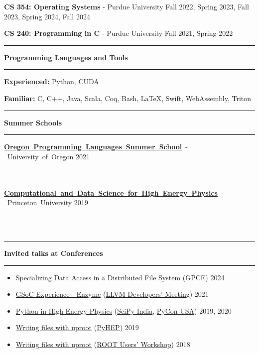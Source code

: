 \documentclass[10pt, letterpaper]{article}
\newcommand{\EducationEntry}[4]{
    \noindent\mbox{#1} \hfill
    \mbox{#2} \\
    \indent
    \mbox{\textit{#3}} \vspace{5pt}\\
    \parbox[t][\height][c]{\textwidth}{\small{#4}}
	\vspace{-14pt}
}
\newcommand{\Section}[1]{
    \Line \par
    \vspace{1pt}
    \textbf{\fontsize{13}{13}\selectfont #1} \par
    \vspace{-7pt}
    \Line \par
    \vspace{3pt}
}
\newcommand{\Line}{
\noindent\rule{\textwidth}{0.4pt}}
\newenvironment{tightitemize}
{
    \vspace{-\topsep}
    \begin{itemize}
        \itemsep2pt \parskip0pt \parsep0pt
}
{
    \end{itemize}
    \vspace{-\topsep}
}
\begin{document}
\textbf{CS 354: Operating Systems} - Purdue University \hfill{Fall 2022, Spring 2023, Fall 2023, Spring 2024, Fall 2024}

\textbf{CS 240: Programming in C} - Purdue University \hfill{Fall 2021, Spring 2022}
\vspace{-6pt}

%
%
\Section{Programming Languages and Tools}
\vspace{-4pt}
\textbf{Experienced:} Python, CUDA

\textbf{Familiar:} C, C++, Java, Scala, Coq, Bash, \LaTeX, Swift, WebAssembly, Triton
\vspace{-6pt}

%
%
\Section{Summer Schools}
\vspace{-4pt}
\indent \EducationEntry{\textbf{{\href{https://www.cs.uoregon.edu/research/summerschool/summer21/index.php}{Oregon Programming Languages Summer School}}} - University of Oregon}{2021}{}{}\vspace{-15pt}\\
\indent \EducationEntry{\textbf{{\href{https://codas-hep.org/}{Computational and Data Science for High Energy Physics}}} - Princeton University}{2019}{}{}\\

\vspace{-34pt}

%
%
\Section{Invited talks at Conferences}
\small{\begin{tightitemize}
\item Specializing Data Access in a Distributed File System (GPCE) \hfill 2024
\item \href{https://youtu.be/mxI9fYbpndI}{GSoC Experience - Enzyme} (\href{https://llvm.swoogo.com/2021devmtg/}{LLVM Developers' Meeting}) \hfill{2021}
\item \href{https://youtu.be/jClVsR6XfdI}{Python in High Energy Physics} (\href{https://scipy.in/2019}{SciPy India}, \href{https://us.pycon.org/2020/}{PyCon USA}) \hfill{2019, 2020}
\item \href{https://indico.cern.ch/event/833895/contributions/3577892/attachments/1927752/3191883/uproot-pyhep.pdf}{Writing files with uproot} (\href{https://indico.cern.ch/event/833895/}{PyHEP}) \hfill{2019}
\item \href{https://indico.cern.ch/event/697389/contributions/3102807/attachments/1713054/2762448/Writing_files_with_uproot.pdf}{Writing files with uproot} (\href{https://indico.cern.ch/event/697389/}{ROOT Users' Workshop}) \hfill{2018}
\end{tightitemize}}
\end{document}
